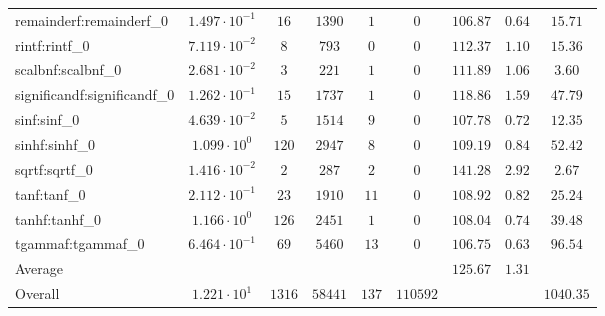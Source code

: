 \begin{tabular}{|l|c|c|c|c|c|c|c|c|}
remainderf:remainderf\_0     & $ 1.497 \cdot 10^{-1} $ & $ 16     $ & $ 1390  $ & $ 1   $ & $ 0      $ & $ 106.87      $ & $ 0.64    $ & $ 15.71   $ \\
rintf:rintf\_0               & $ 7.119 \cdot 10^{-2} $ & $ 8      $ & $ 793   $ & $ 0   $ & $ 0      $ & $ 112.37      $ & $ 1.10    $ & $ 15.36   $ \\
scalbnf:scalbnf\_0           & $ 2.681 \cdot 10^{-2} $ & $ 3      $ & $ 221   $ & $ 1   $ & $ 0      $ & $ 111.89      $ & $ 1.06    $ & $ 3.60    $ \\
significandf:significandf\_0 & $ 1.262 \cdot 10^{-1} $ & $ 15     $ & $ 1737  $ & $ 1   $ & $ 0      $ & $ 118.86      $ & $ 1.59    $ & $ 47.79   $ \\
sinf:sinf\_0                 & $ 4.639 \cdot 10^{-2} $ & $ 5      $ & $ 1514  $ & $ 9   $ & $ 0      $ & $ 107.78      $ & $ 0.72    $ & $ 12.35   $ \\
sinhf:sinhf\_0               & $ 1.099 \cdot 10^{0}  $ & $ 120    $ & $ 2947  $ & $ 8   $ & $ 0      $ & $ 109.19      $ & $ 0.84    $ & $ 52.42   $ \\
sqrtf:sqrtf\_0               & $ 1.416 \cdot 10^{-2} $ & $ 2      $ & $ 287   $ & $ 2   $ & $ 0      $ & $ 141.28      $ & $ 2.92    $ & $ 2.67    $ \\
tanf:tanf\_0                 & $ 2.112 \cdot 10^{-1} $ & $ 23     $ & $ 1910  $ & $ 11  $ & $ 0      $ & $ 108.92      $ & $ 0.82    $ & $ 25.24   $ \\
tanhf:tanhf\_0               & $ 1.166 \cdot 10^{0}  $ & $ 126    $ & $ 2451  $ & $ 1   $ & $ 0      $ & $ 108.04      $ & $ 0.74    $ & $ 39.48   $ \\
tgammaf:tgammaf\_0           & $ 6.464 \cdot 10^{-1} $ & $ 69     $ & $ 5460  $ & $ 13  $ & $ 0      $ & $ 106.75      $ & $ 0.63    $ & $ 96.54   $ \\
\hline
Average                      & $                     $ & $        $ & $       $ & $     $ & $        $ & $ 125.67      $ & $ 1.31    $ & $         $ \\
\hline
Overall                      & $ 1.221 \cdot 10^{1}  $ & $ 1316   $ & $ 58441 $ & $ 137 $ & $ 110592 $ & $             $ & $         $ & $ 1040.35 $ \\
\hline
\end{tabular}
